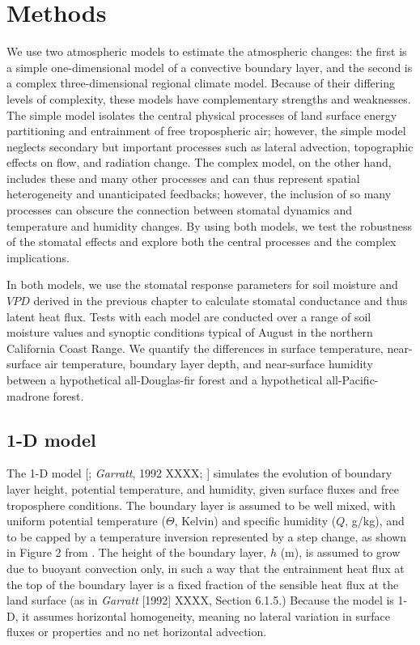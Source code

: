 \section{Methods}

We use two atmospheric models to estimate the atmospheric changes: the first is a simple one-dimensional model of a convective boundary layer, and the second is a complex three-dimensional regional climate model.  Because of their differing levels of complexity, these models have complementary strengths and weaknesses.  The simple model isolates the central physical processes of land surface energy partitioning and entrainment of free tropospheric air; however, the simple model neglects secondary but important processes such as lateral advection, topographic effects on flow, and radiation change.  The complex model, on the other hand, includes these and many other processes and can thus represent spatial heterogeneity and unanticipated feedbacks; however, the inclusion of so many processes can obscure the connection between stomatal dynamics and temperature and humidity changes.  By using both models, we test the robustness of the stomatal effects and explore both the central processes and the complex implications.

In both models, we use the stomatal response parameters for soil moisture and $VPD$ derived in the previous chapter to calculate stomatal conductance and thus latent heat flux.  Tests with each model are conducted over a range of soil moisture values and synoptic conditions typical of August in the northern California Coast Range.  We quantify the differences in surface temperature, near-surface air temperature, boundary layer depth, and near-surface humidity between a hypothetical all-Douglas-fir forest and a hypothetical all-Pacific-madrone forest.

\subsection{1-D model}
The 1-D model [\cite{tennekes1981basic}; \textit{Garratt}, 1992 XXXX; \cite{Siqueira:2009qf}] simulates the evolution of boundary layer height, potential temperature, and humidity, given surface fluxes and free troposphere conditions.  The boundary layer is assumed to be well mixed, with uniform potential temperature ($\Theta$, Kelvin) and specific humidity ($Q$, g/kg), and to be capped by a temperature inversion represented by a step change, as shown in Figure 2 from \cite{Siqueira:2009qf}.  The height of the boundary layer, $h$ (m), is assumed to grow due to buoyant convection only, in such a way that the entrainment heat flux at the top of the boundary layer is a fixed fraction of the sensible heat flux at the land surface (as in \textit{Garratt} [1992] XXXX, Section 6.1.5.)  Because the model is 1-D, it assumes horizontal homogeneity, meaning no lateral variation in surface fluxes or properties and no net horizontal advection.

